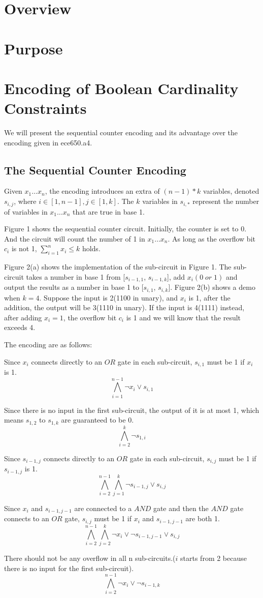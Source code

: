 \documentclass[11pt]{article}
\begin{document}
\section{Overview}\label{section-overview}

\section{Purpose}\label{section-purpose}

\section{Encoding of Boolean Cardinality Constraints}\label{section-encoding}
We will present the sequential counter encoding and its advantage over the encoding given in ece650.a4.
\subsection{The Sequential Counter Encoding}
Given $x_1\ldots x_n$, the encoding introduces an extra of $(n-1)*k$ variables, denoted $s_{i,j}$, where $i \in [1,n-1], j\in [1,k]$. The $k$ variables in $s_{i,*}$ represent the number of variables in $x_1\ldots x_n$ that are true in base 1.

Figure 1 shows the sequential counter circuit. Initially, the counter is set to 0. And the circuit will count the number of 1 in $x_1\ldots x_n$. As long as the overflow bit $c_i$ is not 1, $\sum\limits_{i=1}^{n}x_i\leq k$ holds.

Figure 2(a) shows the implementation of the sub-circuit in Figure 1. The sub-circuit takes a number in base 1 from [$s_{i-1,1}$, $s_{i-1,k}$], add $x_i(0\;or\;1)$ and output the results as a number in base 1 to [$s_{i,1}$, $s_{i,k}$]. Figure 2(b) shows a demo when $k=4$. Suppose the input is 2(1100 in unary), and $x_i$ is 1, after the addition, the output will be 3(1110 in unary). If the input is 4(1111) instead, after adding $x_i=1$, the overflow bit $c_i$ is 1 and we will know that the result exceeds 4.

The encoding are as follows:

Since $x_i$ connects directly to an $OR$ gate in each sub-circuit, $s_{i,1}$ must be 1 if $x_i$ is 1.\[\bigwedge\limits_{i=1}^{n-1} \neg x_i \lor s_{i,1}\]

Since there is no input in the first sub-circuit, the output of it is at most 1, which means $s_{1,2}$ to $s_{1,k}$ are guaranteed to be 0.\[\bigwedge\limits_{i=2}^{k} \neg s_{1,i}\]

Since $s_{i-1,j}$ connects directly to an $OR$ gate in each sub-circuit, $s_{i,j}$ must be 1 if $s_{i-1,j}$ is 1.\[\bigwedge\limits_{i=2}^{n-1}\bigwedge\limits_{j=1}^{k}\neg s_{i-1,j} \lor s_{i,j}\]

Since $x_i$ and $s_{i-1,j-1}$ are connected to a $AND$ gate and then the $AND$ gate connects to an $OR$ gate, $s_{i,j}$ must be 1 if $x_i$ and $s_{i-1,j-1}$ are both 1.\[\bigwedge\limits_{i=2}^{n-1}\bigwedge\limits_{j=2}^{k}\neg x_i\lor\neg s_{i-1,j-1} \lor s_{i,j}\]

There should not be any overflow in all n sub-circuits.($i$ starts from 2 because there is no input for the first sub-circuit).\[\bigwedge\limits_{i=2}^{n-1}\neg x_i\lor\neg s_{i-1,k}\]
\end{document}
